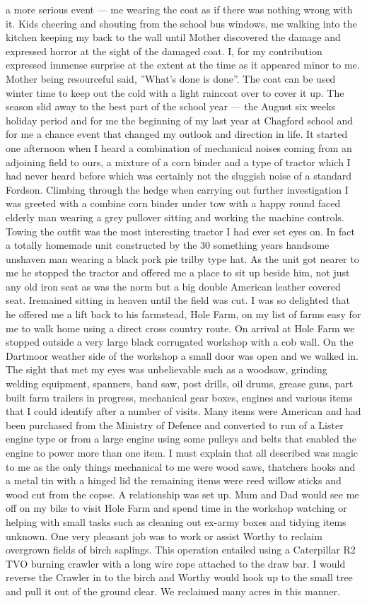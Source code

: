 a more serious event --- me wearing the coat as if there was nothing wrong with
it. Kids cheering and shouting from the school bus windows, me walking into the
kitchen keeping my back to the wall until Mother discovered the damage and
expressed horror at the sight of the damaged coat. I, for my contribution
expressed immense surprise at the extent at the time as it appeared minor to
me. Mother being resourceful said, ''What's done is done''. The coat can be
used winter time to keep out the cold with a light raincoat over to cover it
up. The season slid away to the best part of the school year --- the August
six weeks holiday period and for me the beginning of my last year at Chagford
school and for me a chance event that changed my outlook and direction in life.
It started one afternoon when I heard a combination of mechanical noises coming
from an adjoining field to ours, a mixture of a corn binder and a type of
tractor which I had never heard before which was certainly not the sluggish
noise of a standard Fordson. Climbing through the hedge when carrying out
further investigation I was greeted with a combine corn binder under tow with a
happy round faced elderly man wearing a grey pullover sitting and working the
machine controls. Towing the outfit was the most interesting tractor I had
ever set eyes on. In fact a totally homemade unit constructed by the 30
something years handsome unshaven man wearing a black pork pie trilby type hat.
As the unit got nearer to me he stopped the tractor and offered me a place to
sit up beside him, not just any old iron seat as was the norm but a big double
American leather covered seat. Iremained sitting in heaven until the field was
cut. I was so delighted that he offered me a lift back to his farmstead, Hole
Farm, on my list of farms easy for me to walk home using a direct cross country
route. On arrival at Hole Farm we stopped outside a very large black
corrugated workshop with a cob wall. On the Dartmoor weather side of the
workshop a small door was open and we walked in. The sight that met my eyes was
unbelievable such as a woodsaw, grinding welding equipment, spanners, band saw,
post drills, oil drums, grease guns, part built farm trailers in progress,
mechanical gear boxes, engines and various items that I could identify after a
number of visits. Many items were American and had been purchased from the
Ministry of Defence and converted to run of a Lister engine type or from a
large engine using some pulleys and belts that enabled the engine to power more
than one item. I must explain that all described was magic to me as the only
things mechanical to me were wood saws, thatchers hooks and a metal tin with a
hinged lid the remaining items were reed willow sticks and wood cut from the
copse. A relationship was set up. Mum and Dad would see me off on my bike to
visit Hole Farm and spend time in the workshop watching or helping with small
tasks such as cleaning out ex-army boxes and tidying items unknown. One very
pleasant job was to work or assist Worthy to reclaim overgrown fields of birch
saplings. This operation entailed using a Caterpillar R2 TVO burning crawler
with a long wire rope attached to the draw bar. I would reverse the Crawler in
to the birch and Worthy would hook up to the small tree and pull it out of the
ground clear. We reclaimed many acres in this manner.
